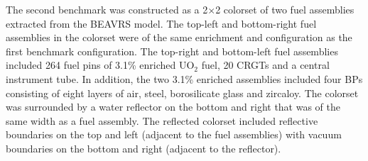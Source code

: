 The second benchmark was constructed as a 2$\times$2 colorset of two fuel assemblies extracted from the BEAVRS model. The top-left and bottom-right fuel assemblies in the colorset were of the same enrichment and configuration as the first benchmark configuration. The top-right and bottom-left fuel assemblies included 264 fuel pins of 3.1\% enriched UO$_2$ fuel, 20 CRGTs and a central instrument tube. In addition, the two 3.1\% enriched assemblies included four BPs consisting of eight layers of air, steel, borosilicate glass and zircaloy. The colorset was surrounded by a water reflector on the bottom and right that was of the same width as a fuel assembly. The reflected colorset included reflective boundaries on the top and left (adjacent to the fuel assemblies) with vacuum boundaries on the bottom and right (adjacent to the reflector).


